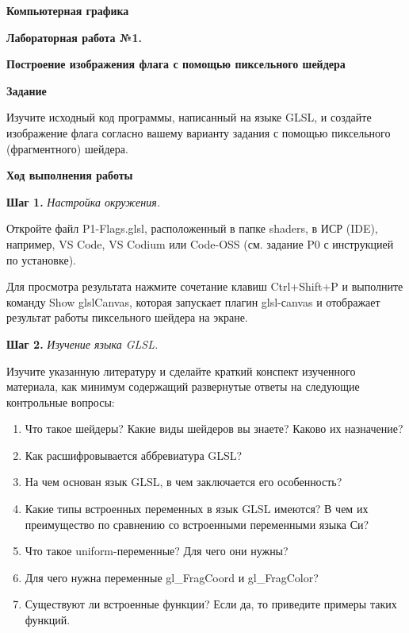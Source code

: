 \documentclass[a4paper,12pt]{article}
\theoremstyle{plain}
\begin{document}
    \begin{center}
    \textbf{{\Large Компьютерная графика}}
    
    \textbf{{\large Лабораторная работа №1. }}
    
    \textbf{{\large Построение изображения флага с помощью пиксельного шейдера}}
    \end{center}
    
    
    \textbf{Задание}
    
    Изучите исходный код программы, написанный на языке GLSL, и создайте изображение флага согласно вашему варианту задания с помощью пиксельного (фрагментного) шейдера.
        
    \textbf{Ход выполнения работы}
    
    \textbf{Шаг 1. }\textit{Настройка окружения.} 
        
    Откройте файл P1-Flags.glsl, расположенный в папке shaders, в ИСР (IDE), например, VS Code, VS Codium или Code-OSS (см. задание P0 с инструкцией по установке). 
    
    Для просмотра результата нажмите сочетание клавиш Ctrl+Shift+P и выполните команду \textquotedbl Show glslCanvas\textquotedbl, которая запускает плагин glsl-сanvas и отображает результат работы пиксельного шейдера на экране.
    
    \textbf{Шаг 2.} \textit{Изучение языка GLSL.} 
    
    Изучите указанную литературу и сделайте краткий конспект изученного материала, как минимум содержащий развернутые ответы на следующие контрольные вопросы:
    \begin{enumerate}
    \item Что такое шейдеры? Какие виды шейдеров вы знаете? Каково их назначение?
    \item Как расшифровывается аббревиатура GLSL?
    \item На чем основан язык GLSL, в чем заключается его особенность?
    \item Какие типы встроенных переменных в язык GLSL имеются? В чем их преимущество по сравнению со встроенными переменными языка Си?
    \item Что такое uniform-переменные? Для чего они нужны?
    \item Для чего нужна переменные gl\_FragCoord и gl\_FragColor?
    \item Существуют ли встроенные функции? Если да, то приведите примеры таких функций.
    \end{enumerate}
    
\end{document}
